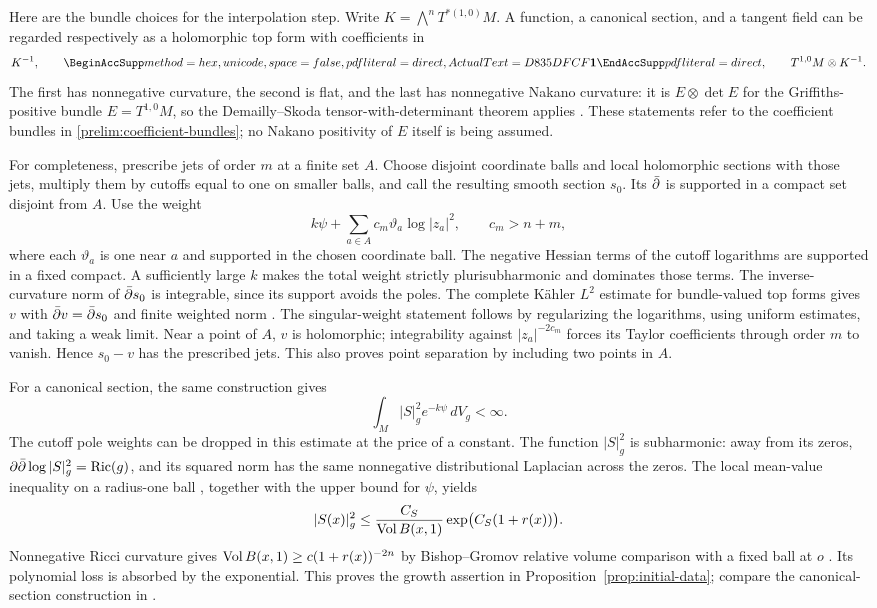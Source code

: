 Here are the bundle choices for the interpolation step.  Write
$K=\bigwedge^nT^{*(1,0)}M$.  A function, a canonical section, and a
tangent field can be regarded respectively as a holomorphic top form
with coefficients in
\begin{equation}\label{prelim:coefficient-bundles}
 K^{-1},\qquad \boldone,\qquad T^{1,0}M\otimes K^{-1}.
\end{equation}
The first has nonnegative curvature, the second is flat, and the last
has nonnegative Nakano curvature: it is $E\otimes\det E$ for the
Griffiths-positive bundle $E=T^{1,0}M$, so the
Demailly--Skoda tensor-with-determinant theorem applies
\cite[Theorem~2.6]{Demailly}.  These statements refer to the coefficient bundles
in \eqref{prelim:coefficient-bundles}; no Nakano positivity of $E$
itself is being assumed.

For completeness, prescribe jets of order $m$ at a finite set $A$.
Choose disjoint coordinate balls and local holomorphic sections with
those jets, multiply them by cutoffs equal to one on smaller balls,
and call the resulting smooth section $s_0$.  Its $\bar\partial$ is supported
in a compact set disjoint from $A$.  Use the weight
\[
 k\psi+\sum_{a\in A}c_m\vartheta_a\log|z_a|^2,
 \qquad c_m>n+m,
\]
where each $\vartheta_a$ is one near $a$ and supported in the chosen
coordinate ball.  The negative Hessian terms of the cutoff logarithms
are supported in a fixed compact.  A sufficiently large $k$ makes the
total weight strictly plurisubharmonic and dominates those terms.
The inverse-curvature norm of $\bar\partial s_0$ is integrable, since its
support avoids the poles.  The complete K\"ahler $L^2$ estimate for
bundle-valued top forms gives $v$ with
$\bar\partial v=\bar\partial s_0$ and finite weighted norm
\cite{Hormander}\cite[Theorem~5.1]{Demailly}.  The singular-weight statement follows by
regularizing the logarithms, using uniform estimates, and taking a
weak limit.  Near a point of $A$, $v$ is holomorphic; integrability
against $|z_a|^{-2c_m}$ forces its Taylor coefficients through order
$m$ to vanish.  Hence $s_0-v$ has the prescribed jets.  This also proves
point separation by including two points in $A$.

For a canonical section, the same construction gives
\[
 \int_M |S|_g^2 e^{-k\psi}\,dV_g<\infty.
\]
The cutoff pole weights can be dropped in this estimate at the price
of a constant.  The function $|S|_g^2$ is subharmonic: away from its
zeros, $\partial\bar\partial\log|S|_g^2=\operatorname{Ric}(g)$, and its squared norm has the same
nonnegative distributional Laplacian across the zeros.  The local
mean-value inequality on a radius-one ball
\cite[Theorem~2.1]{LiSchoen}, together with the upper bound for
$\psi$, yields
\[
 |S(x)|_g^2\le
 \frac{C_S}{\operatorname{Vol} B(x,1)}\exp\bigl(C_S(1+r(x))\bigr).
\]
Nonnegative Ricci curvature gives
$\operatorname{Vol} B(x,1)\ge c(1+r(x))^{-2n}$ by Bishop--Gromov relative volume
comparison with a fixed ball at $o$ \cite[\S2.1]{GromovBetti}.
Its polynomial loss is absorbed by the exponential.
This proves the growth assertion in Proposition~\ref{prop:initial-data};
compare the canonical-section construction in
\cite[Section~3]{ChenZhu}.

